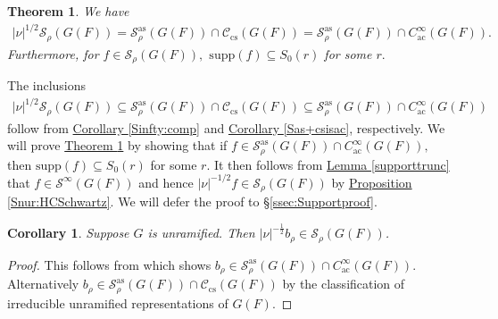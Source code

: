 \documentclass[10pt]{amsart}
\newtheorem{theorem}{Theorem}[section]
\newtheorem{corollary}{Corollary}[theorem]
\theoremstyle{definition}
\numberwithin{equation}{section}
\numberwithin{equation}{subsection}
\begin{document}
\begin{theorem}\label{Schwartz=as+cs}
   We have 
\begin{align*}|\nu|^{1/2}\mathcal{S}_\rho(G(F))=\mathcal{S}_{\rho}^{\mathrm{as}}(G(F))\cap  \mathcal{C}_{\mathrm{cs}}(G(F))=\mathcal{S}_\rho^{\mathrm{as}}(G(F))\cap C^\infty_{\mathrm{ac}}(G(F)).
   \end{align*}
   Furthermore, for $f\in \mathcal{S}_\rho(G(F)),$ $\mathrm{supp}(f)\subseteq S_0(r)$ for some $r.$
\end{theorem}

The inclusions 
\begin{align*}
|\nu|^{1/2}\mathcal{S}_\rho(G(F))\subseteq\mathcal{S}_{\rho}^{\mathrm{as}}(G(F))\cap  \mathcal{C}_{\mathrm{cs}}(G(F))\subseteq\mathcal{S}_\rho^{\mathrm{as}}(G(F))\cap C^\infty_{\mathrm{ac}}(G(F))
\end{align*}
follow from \hyperref[Sinfty:comp]{Corollary \ref{Sinfty:comp}} and \hyperref[Sas+csisac]{Corollary \ref{Sas+csisac}}, respectively. We will prove \hyperref[Schwartz=as+cs]{Theorem \ref{Schwartz=as+cs}} by showing that if $f\in\mathcal{S}_{\rho}^{\mathrm{as}}(G(F))\cap  C^\infty_{\mathrm{ac}}(G(F)),$ then $\mathrm{supp}(f)\subseteq S_0(r)$ for some $r$. It then follows from \hyperref[supporttrunc]{Lemma \ref{supporttrunc}} that $f\in \mathcal{S}^\infty(G(F))$ and hence $|\nu|^{-1/2}f\in \mathcal{S}_\rho(G(F))$ by \hyperref[Snur:HCSchwartz]{Proposition \ref{Snur:HCSchwartz}}. We will defer the proof to \S \ref{ssec:Supportproof}.

\begin{corollary}
   Suppose $G$ is unramified. Then $|\nu|^{-\frac{1}{2}}b_\rho\in\mathcal{S}_\rho(G(F))$. 
\end{corollary}

\begin{proof}
    This follows from \cite[Proposition 6.16]{DRS} which shows  $b_\rho\in \mathcal{S}_\rho^{\mathrm{as}}(G(F))\cap C^\infty_{\mathrm{ac}}(G(F)).$ Alternatively $b_\rho\in \mathcal{S}_\rho^{\mathrm{as}}(G(F))\cap \mathcal{C}_{\mathrm{cs}}(G(F))$ by the classification of irreducible unramified representations of $G(F)$. 
\end{proof}
\end{document}
